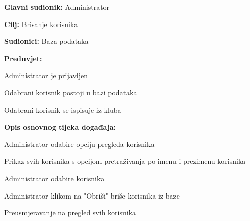\documentclass[times, utf8, zavrsni]{fer}
\newenvironment{packed_enum}{
	\begin{enumerate}
		\setlength{\itemsep}{0pt}
		\setlength{\parskip}{0pt}
		\setlength{\parsep}{0pt}
	}{\end{enumerate}}
\newenvironment{packed_item}{
	\begin{itemize}
		\setlength{\itemsep}{0pt}
		\setlength{\parskip}{0pt}
		\setlength{\parsep}{0pt}
	}{\end{itemize}}
\begin{document}
			\noindent {}
					\begin{packed_item}
						
						\item \textbf{Glavni sudionik: } Administrator
						\item  \textbf{Cilj:} Brisanje korisnika
						\item  \textbf{Sudionici:} Baza podataka
						\item  \textbf{Preduvjet:} 
						
						\item[] \begin{packed_enum}
							
							\item Administrator je prijavljen
							\item Odabrani korisnik postoji u bazi podataka
							\item Odabrani korisnik se ispisuje iz kluba
							
							
						\end{packed_enum}
						
						\item  \textbf{Opis osnovnog tijeka događaja:}
						
						\item[] \begin{packed_enum}
							
							\item Administrator odabire opciju pregleda korisnika
							\item Prikaz svih korisnika s opcijom pretraživanja po imenu i prezimenu korisnika
							\item Administrator odabire korisnika
							\item Administrator klikom na "Obriši" briše korisnika iz baze
							\item Preusmjeravanje na pregled svih korisnika
							
						\end{packed_enum}
						
						
					\end{packed_item}
					
\end{document}
